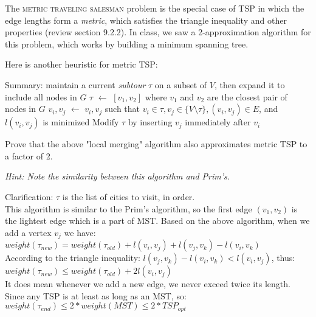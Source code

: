 \documentclass{article}\usepackage[utf8]{inputenc}\usepackage[margin=0.4cm,top=0.4cm,bottom=0.4cm]{geometry}\usepackage[usenames,dvipsnames,svgnames,table]{xcolor}
\newcommand*\Let[2]{\State #1 $\gets$ #2}
\begin{document}
\noindent The \textsc{metric traveling salesman} problem is the special case of TSP in which the edge lengths form a \textit{metric}, which satisfies the triangle inequality and other properties (review section 9.2.2). In class, we saw a 2-approximation algorithm for this problem, which works by building a minimum spanning tree.

\vspace{2pt}\noindent Here is another heuristic for metric TSP:
\begin{algorithm}
\begin{algorithmic}[1]
\vspace{-10pt}\State Summary: maintain a current \textit{subtour} $\tau$ on a subset of $V$, then expand it to include all nodes in $G$
\vspace{12pt}
\Let {$\tau$}{$[v_1, v_2]$ where $v_1$ and $v_2$ are the closest pair of nodes in $G$}
\Let {$v_i, v_j$}{$v_i, v_j$ such that $v_i \in \tau, v_j \in \{V \setminus \tau\},(v_i, v_j) \in E$, and $l(v_i, v_j)$ is minimized}
\State Modify $\tau$ by inserting $v_j$ immediately after $v_i$
\EndWhile
\EndFunction
\end{algorithmic}
\end{algorithm}

\noindent Prove that the above "local merging" algorithm also approximates metric TSP to a factor of 2.

\vspace{4pt}\noindent \textit{Hint: Note the similarity between this algorithm and Prim's.}

\vspace{4pt}\noindent Clarification: $\tau$ is the list of cities to visit, in order.
\BeginSolution %
\\
This algorithm is similar to the Prim's algorithm, so the first edge $(v_1, v_2)$ is the lightest edge which is a part of MST. Based on the above algorithm, when we add a vertex $v_j$ we have:\\
\hspace{1cm} $weight(\tau_{new}) = weight(\tau_{old}) + l(v_i,v_j) + l(v_j,v_k) - l(v_i,v_k)$
\\
According to the triangle inequality: $l(v_j,v_k) - l(v_i,v_k) < l(v_i,v_j)$, thus:\\
$weight(\tau_{new}) \leq weight(\tau_{old}) + 2l(v_i,v_j)$
\\
It does mean whenever we add a new edge, we never exceed twice its length. Since any TSP is at least as long as an MST, so:\\
$weight(\tau_{end}) \leq 2*weight(MST) \leq 2*TSP_{opt}$
\\
\EndSolution
\clearpage
\end{document}
